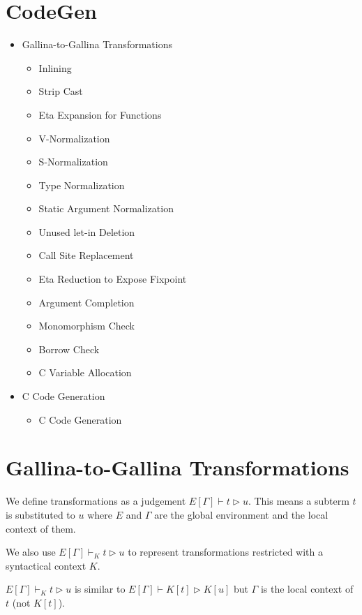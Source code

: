 \documentclass[a4paper,fleqn]{article}
\def\gallina{\textrm{Gallina}}
\newcommand{\reltri}{\mathrel{\triangleright}}
\begin{document}
\section{CodeGen}\label{sec:codegen}

\begin{itemize}
\item \gallina-to-\gallina{} Transformations
  \begin{itemize}
  \item Inlining
  \item Strip Cast
  \item Eta Expansion for Functions
  \item V-Normalization
  \item S-Normalization
  \item Type Normalization
  \item Static Argument Normalization
  \item Unused let-in Deletion
  \item Call Site Replacement
  \item Eta Reduction to Expose Fixpoint
  \item Argument Completion
  \item Monomorphism Check
  \item Borrow Check
  \item C Variable Allocation
  \end{itemize}
\item C Code Generation
  \begin{itemize}
  \item C Code Generation
  \end{itemize}
\end{itemize}

\section{\gallina-to-\gallina{} Transformations}\label{sec:gallina-to-gallina-transformations}

We define transformations as a judgement $E[\Gamma] \vdash t \reltri u$.
This means a subterm $t$ is substituted to $u$ where
$E$ and $\Gamma$ are the global environment and the local context of them.

We also use $E[\Gamma] \vdash_K t \reltri u$ to represent transformations restricted with a syntactical context $K$.

$E[\Gamma] \vdash_K t \reltri u$ is similar to $E[\Gamma] \vdash K[t] \reltri K[u]$ but
$\Gamma$ is the local context of $t$ (not $K[t]$).
\end{document}
